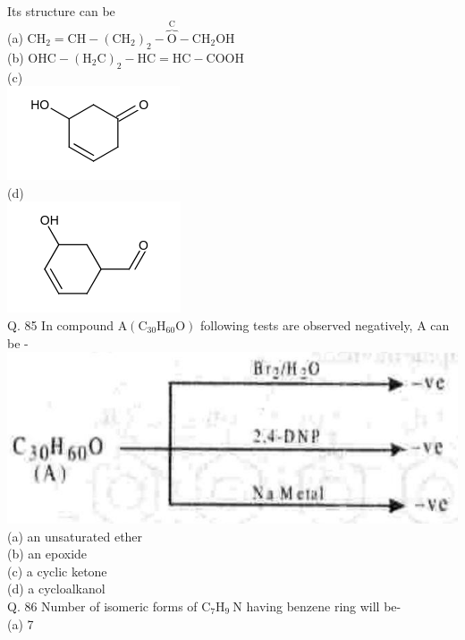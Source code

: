 \documentclass[10pt]{article}
\begin{document}
Its structure can be\\
(a) $\mathrm{CH}_{2}=\mathrm{CH}-\left(\mathrm{CH}_{2}\right)_{2}-\overbrace{\mathrm{O}}^{\mathrm{C}}-\mathrm{CH}_{2} \mathrm{OH}$\\
(b) $\mathrm{OHC}-\left(\mathrm{H}_{2} \mathrm{C}\right)_{2}-\mathrm{HC}=\mathrm{HC}-\mathrm{COOH}$\\
(c)\\
\includegraphics{smile-e1e2b224306bdcd1bab639b111cccc482af326b4}\\
(d)\\
\includegraphics{smile-2dd524b81d565e5342798c0e4addae26131f23d2}\\
Q. 85 In compound $\mathrm{A}\left(\mathrm{C}_{30} \mathrm{H}_{60} \mathrm{O}\right)$ following tests are observed negatively, A can be -\\
\includegraphics[max width=\textwidth, center]{2025_01_28_8470952b98110cec3aabg-138(2)}\\
(a) an unsaturated ether\\
(b) an epoxide\\
(c) a cyclic ketone\\
(d) a cycloalkanol\\
Q. 86 Number of isomeric forms of $\mathrm{C}_{7} \mathrm{H}_{9} \mathrm{~N}$ having benzene ring will be-\\
(a) 7\\
\end{document}
